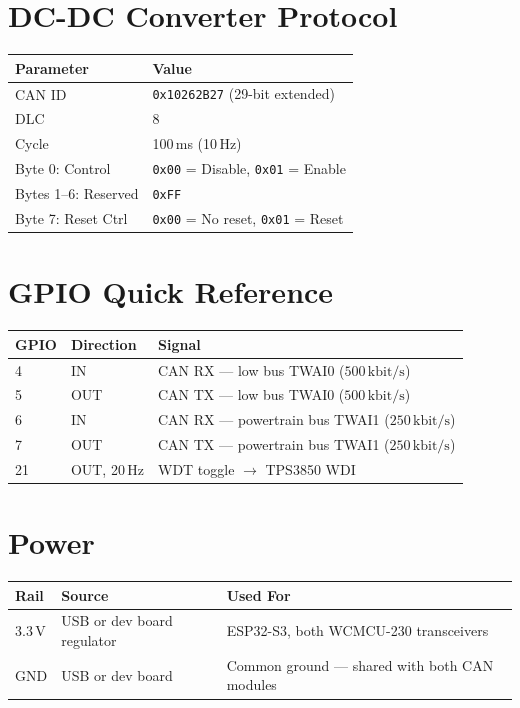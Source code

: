 \documentclass[12pt,a4paper,oneside]{report}
\newcommand{\bitrate}[1]{\ensuremath{#1\,\text{kbit/s}}}
\begin{document}
\section{DC-DC Converter Protocol}

\begin{center}
\begin{tabular}{ll}
\toprule
\textbf{Parameter} & \textbf{Value} \\
\midrule
CAN ID               & \texttt{0x10262B27} (29-bit extended) \\
DLC                  & 8 \\
Cycle                & 100\,ms (10\,Hz) \\
Byte 0: Control      & \texttt{0x00} = Disable, \texttt{0x01} = Enable \\
Bytes 1--6: Reserved & \texttt{0xFF} \\
Byte 7: Reset Ctrl   & \texttt{0x00} = No reset, \texttt{0x01} = Reset \\
\bottomrule
\end{tabular}
\end{center}

\section{GPIO Quick Reference}

\begin{center}
\begin{tabular}{lll}
\toprule
\textbf{GPIO} & \textbf{Direction} & \textbf{Signal} \\
\midrule
4  & IN            & CAN RX --- low bus TWAI0 (\bitrate{500}) \\
5  & OUT           & CAN TX --- low bus TWAI0 (\bitrate{500}) \\
6  & IN            & CAN RX --- powertrain bus TWAI1 (\bitrate{250}) \\
7  & OUT           & CAN TX --- powertrain bus TWAI1 (\bitrate{250}) \\
21 & OUT, 20\,Hz   & WDT toggle $\rightarrow$ TPS3850 WDI \\
\bottomrule
\end{tabular}
\end{center}

\section{Power}

\begin{center}
\begin{tabular}{lll}
\toprule
\textbf{Rail} & \textbf{Source} & \textbf{Used For} \\
\midrule
3.3\,V & USB or dev board regulator & ESP32-S3, both WCMCU-230 transceivers \\
GND    & USB or dev board & Common ground --- shared with both CAN modules \\
\bottomrule
\end{tabular}
\end{center}
\end{document}
